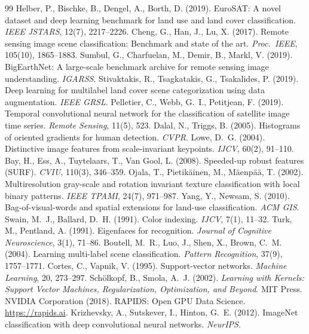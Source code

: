 \documentclass[10pt,letterpaper]{article}
\begin{document}
\begin{thebibliography}{99}
 Helber, P., Bischke, B., Dengel, A., Borth, D. (2019). EuroSAT: A novel dataset and deep learning benchmark for land use and land cover classification. \emph{IEEE JSTARS}, 12(7), 2217--2226.
 Cheng, G., Han, J., Lu, X. (2017). Remote sensing image scene classification: Benchmark and state of the art. \emph{Proc.\ IEEE}, 105(10), 1865--1883.
 Sumbul, G., Charfuelan, M., Demir, B., Markl, V. (2019). BigEarthNet: A large-scale benchmark archive for remote sensing image understanding. \emph{IGARSS}.
 Stivaktakis, R., Tsagkatakis, G., Tsakalides, P. (2019). Deep learning for multilabel land cover scene categorization using data augmentation. \emph{IEEE GRSL}.
 Pelletier, C., Webb, G.~I., Petitjean, F. (2019). Temporal convolutional neural network for the classification of satellite image time series. \emph{Remote Sensing}, 11(5), 523.
 Dalal, N., Triggs, B. (2005). Histograms of oriented gradients for human detection. \emph{CVPR}.
 Lowe, D.~G. (2004). Distinctive image features from scale-invariant keypoints. \emph{IJCV}, 60(2), 91--110.
 Bay, H., Ess, A., Tuytelaars, T., Van Gool, L. (2008). Speeded-up robust features (SURF). \emph{CVIU}, 110(3), 346--359.
 Ojala, T., Pietik\"{a}inen, M., M\"{a}enp\"{a}\"{a}, T. (2002). Multiresolution gray-scale and rotation invariant texture classification with local binary patterns. \emph{IEEE TPAMI}, 24(7), 971--987.
 Yang, Y., Newsam, S. (2010). Bag-of-visual-words and spatial extensions for land-use classification. \emph{ACM GIS}.
 Swain, M.~J., Ballard, D.~H. (1991). Color indexing. \emph{IJCV}, 7(1), 11--32.
 Turk, M., Pentland, A. (1991). Eigenfaces for recognition. \emph{Journal of Cognitive Neuroscience}, 3(1), 71--86.
 Boutell, M.~R., Luo, J., Shen, X., Brown, C.~M. (2004). Learning multi-label scene classification. \emph{Pattern Recognition}, 37(9), 1757--1771.
 Cortes, C., Vapnik, V. (1995). Support-vector networks. \emph{Machine Learning}, 20, 273--297.
 Sch\"{o}lkopf, B., Smola, A.~J. (2002). \emph{Learning with Kernels: Support Vector Machines, Regularization, Optimization, and Beyond}. MIT Press.
 NVIDIA Corporation (2018). RAPIDS: Open GPU Data Science. \url{https://rapids.ai}.
 Krizhevsky, A., Sutskever, I., Hinton, G.~E. (2012). ImageNet classification with deep convolutional neural networks. \emph{NeurIPS}.

\end{thebibliography}
\end{document}
